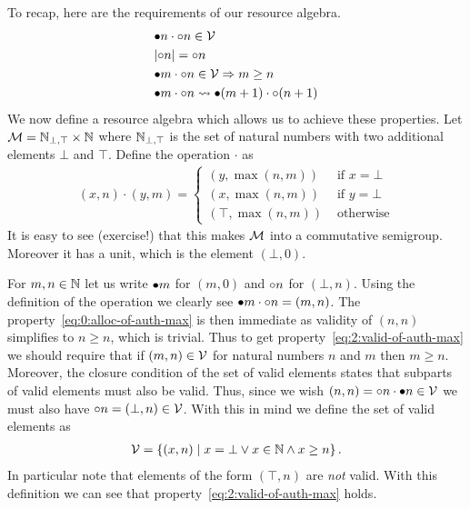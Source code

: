 To recap, here are the requirements of our resource algebra.
\begin{align}
  \label{eq:0:alloc-of-auth-max}
  &\mathord{\bullet} n \cdot \mathord{\circ} n \in \mathcal{V}\\
  \label{eq:1:core-of-auth-max}
  &{\mid}\mathord{\circ} n{\mid} = \mathord{\circ}{n}\\
  \label{eq:2:valid-of-auth-max}
  &\mathord{\bullet} m \cdot \mathord{\circ} n \in \mathcal{V} \Rightarrow m \geq n\\
  \label{eq:3:valid-update-auth-max}
  &\mathord{\bullet} m \cdot \mathord{\circ} n \rightsquigarrow \mathord{\bullet} (m+1) \cdot \mathord{\circ} (n+1)
\end{align}
We now define a resource algebra which allows us to achieve these properties.
Let $\mathcal{M} = \mathbb{N}_{\bot,\top} \times \mathbb{N}$ where $\mathbb{N}_{\bot,\top}$ is the set of natural numbers with two additional elements $\bot$ and $\top$.
Define the operation $\cdot$ as
\begin{align*}
  (x, n) \cdot (y, m) =
  \begin{cases}
    (y, \max(n, m)) & \text{ if } x = \bot\\
    (x, \max(n, m)) & \text{ if } y = \bot\\
    (\top, \max(n, m)) & \text{ otherwise}
  \end{cases}
\end{align*}
It is easy to see (exercise!) that this makes $\mathcal{M}$ into a commutative semigroup.
Moreover it has a unit, which is the element $(\bot, 0)$.

For $m, n \in \mathbb{N}$ let us write $\mathord{\bullet} m$ for $(m, 0)$ and $\mathord{\circ} n$ for $(\bot, n)$.
Using the definition of the operation we clearly see $\mathord{\bullet} m \cdot \mathord{\circ} n = (m, n)$.
The property~\eqref{eq:0:alloc-of-auth-max} is then immediate as validity of
$(n,n)$ simplifies to $n \geq n$, which is trivial.
Thus to get property~\eqref{eq:2:valid-of-auth-max} we should require that if $(m, n) \in \mathcal{V}$ for natural numbers $n$ and $m$ then $m \geq n$.
Moreover, the closure condition of the set of valid elements states that subparts of valid elements must also be valid.
Thus, since we wish $(n, n) = \mathord{\circ} n \cdot \mathord{\bullet} n \in \mathcal{V}$ we must also have $\mathord{\circ} n = (\bot, n) \in \mathcal{V}$.
With this in mind we define the set of valid elements as
\begin{align*}
  \Vl = \left\{(x, n) \isetsep x = \bot \lor x \in \NN \land x \geq n\right\}.
\end{align*}
In particular note that elements of the form $(\top, n)$ are \emph{not} valid.
With this definition we can see that property~\eqref{eq:2:valid-of-auth-max} holds.

